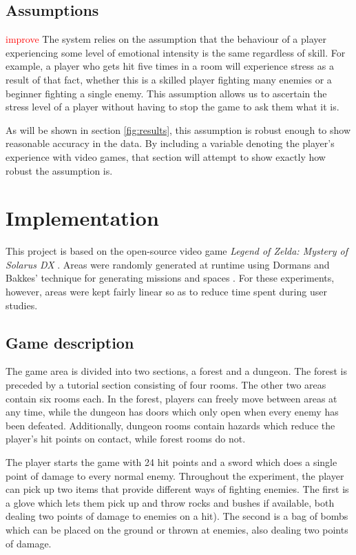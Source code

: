 \documentclass[a4paper]{article}
\begin{document}
\begin{multicols*}{2}
\subsection{Assumptions}
\textcolor{red}{improve}
The system relies on the assumption that the behaviour of a player experiencing some level of emotional intensity is the same regardless of skill. For example, a player who gets hit five times in a room will experience stress as a result of that fact, whether this is a skilled player fighting many enemies or a beginner fighting a single enemy. This assumption allows us to ascertain the stress level of a player without having to stop the game to ask them what it is.

As will be shown in section \ref{fig:results}, this assumption is robust enough to show reasonable accuracy in the data. By including a variable denoting the player's experience with video games, that section will attempt to show exactly how robust the assumption is.

\section{Implementation}
This project is based on the open-source video game \emph{Legend of Zelda: Mystery of Solarus DX} \cite{zeldasolarus}. Areas were randomly generated at runtime using Dormans and Bakkes' technique for generating missions and spaces \cite{missiongrammar}. For these experiments, however, areas were kept fairly linear so as to reduce time spent during user studies. 

\subsection{Game description}
The game area is divided into two sections, a forest and a dungeon. The forest is preceded by a tutorial section consisting of four rooms. The other two areas contain six rooms each. In the forest, players can freely move between areas at any time, while the dungeon has doors which only open when every enemy has been defeated. Additionally, dungeon rooms contain hazards which reduce the player's hit points on contact, while forest rooms do not.

The player starts the game with 24 hit points and a sword which does a single point of damage to every normal enemy. Throughout the experiment, the player can pick up two items that provide different ways of fighting enemies. The first is a glove which lets them pick up and throw rocks and bushes if available, both dealing two points of damage to enemies on a hit). The second is a bag of bombs which can be placed on the ground or thrown at enemies, also dealing two points of damage. 


\end{multicols*}
\end{document}
